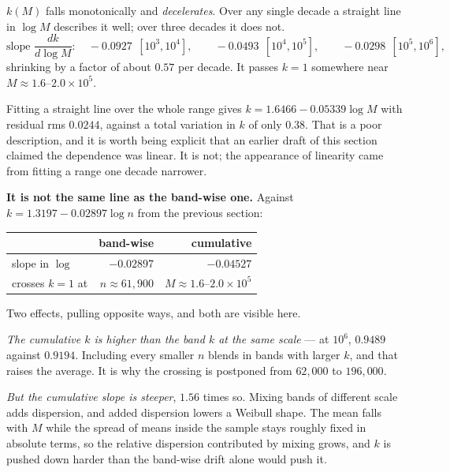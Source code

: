 \documentclass[12pt,a4paper]{article}
\begin{document}
\begin{tcolorbox}[colback=blue!6, colframe=blue!45!black, arc=2mm]
$k(M)$ falls monotonically and \emph{decelerates}. Over any single decade a
straight line in $\log M$ describes it well; over three decades it does not.
\[
  \text{slope } \frac{dk}{d\log M}:\quad
  -0.0927 \ \ [10^3,10^4], \qquad
  -0.0493 \ \ [10^4,10^5], \qquad
  -0.0298 \ \ [10^5,10^6],
\]
shrinking by a factor of about $0.57$ per decade. It passes $k=1$ somewhere
near $M \approx 1.6$--$2.0 \times 10^5$.
\end{tcolorbox}

Fitting a straight line over the whole range gives $k = 1.6466-0.05339\log M$
with residual rms $0.0244$, against a total variation in $k$ of only $0.38$.
That is a poor description, and it is worth being explicit that an earlier
draft of this section claimed the dependence was linear. It is not; the
appearance of linearity came from fitting a range one decade narrower.

\textbf{It is not the same line as the band-wise one.} Against $k = 1.3197 - 0.02897\log n$ from the previous section:

\begin{center}
\begin{tabular}{lrr}
\toprule
 & band-wise & cumulative \\
\midrule
slope in $\log$ & $-0.02897$ & $-0.04527$ \\
crosses $k=1$ at & $n \approx 61{,}900$ & $M \approx 1.6$--$2.0\times10^5$ \\
\bottomrule
\end{tabular}
\end{center}

Two effects, pulling opposite ways, and both are visible here.

\emph{The cumulative $k$ is higher than the band $k$ at the same scale} --- at $10^6$, $0.9489$ against $0.9194$. Including every smaller $n$ blends in bands with larger $k$, and that raises the average. It is why the crossing is postponed from $62{,}000$ to $196{,}000$.

\emph{But the cumulative slope is steeper}, $1.56$ times so. Mixing bands of different scale adds dispersion, and added dispersion lowers a Weibull shape. The mean falls with $M$ while the spread of means inside the sample stays roughly fixed in absolute terms, so the relative dispersion contributed by mixing grows, and $k$ is pushed down harder than the band-wise drift alone would push it.
\end{document}
